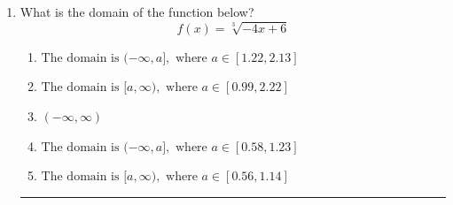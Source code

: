 \documentclass[14pt]{extbook}
\newcommand{\litem}[1]{\item#1\hspace*{-1cm}\rule{\textwidth}{0.4pt}}
\begin{document}
\begin{enumerate}
{\begin{enumerate}[label=\Alph*.]
\end{enumerate} }
\litem{
What is the domain of the function below?\[ f(x) = \sqrt[3]{-4 x + 6} \]\begin{enumerate}[label=\Alph*.]
\item \( \text{The domain is } (-\infty, a], \text{   where } a \in [1.22, 2.13] \)
\item \( \text{The domain is } [a, \infty), \text{   where } a \in [0.99, 2.22] \)
\item \( (-\infty, \infty) \)
\item \( \text{The domain is } (-\infty, a], \text{   where } a \in [0.58, 1.23] \)
\item \( \text{The domain is } [a, \infty), \text{   where } a \in [0.56, 1.14] \)

\end{enumerate} }
\end{enumerate}
\end{document}
